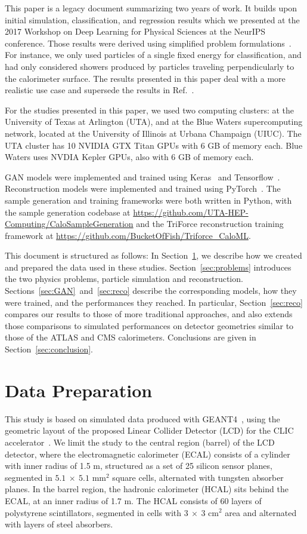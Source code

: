 This paper is a legacy document summarizing two years of work. It builds upon initial simulation, classification, and regression results which we presented at the 2017 Workshop on Deep Learning for Physical Sciences at the NeurIPS conference. Those results were derived using simplified problem formulations~\cite{Mau2017}.  For instance, we only used particles of a single fixed energy for classification, and had only considered showers produced by particles traveling perpendicularly to the calorimeter surface. The results presented in this paper deal with a more realistic use case and supersede the results in Ref.~\cite{Mau2017}. 

For the studies presented in this paper, we used two computing clusters: at the University of Texas at Arlington (UTA), and at the Blue Waters supercomputing network, located at the University of Illinois at Urbana Champaign (UIUC). The UTA cluster has 10 NVIDIA GTX Titan GPUs with 6 GB of memory each. Blue Waters uses NVDIA Kepler GPUs, also with 6 GB of memory each. 

GAN models were implemented and trained using Keras~\cite{keras} and  Tensorflow~\cite{tensorflow2015-whitepaper}. Reconstruction models were implemented and trained using PyTorch~\cite{PyTorch}. The sample generation and training frameworks were both written in Python, with the sample generation codebase at \url{https://github.com/UTA-HEP-Computing/CaloSampleGeneration} and the TriForce reconstruction training framework at \url{https://github.com/BucketOfFish/Triforce_CaloML}.

This document is structured as follows: In Section~\ref{sec:data}, we describe how we created and prepared the data used in these studies. Section~\ref{sec:problems} introduces the two physics problems, particle simulation and reconstruction. Sections~\ref{sec:GAN}~and~\ref{sec:reco} describe the corresponding models, how they were trained, and the performances they reached. In particular, Section~\ref{sec:reco} compares our results to those of more traditional approaches, and also extends those comparisons to simulated performances on detector geometries similar to those of the ATLAS and CMS calorimeters. Conclusions are given in Section~\ref{sec:conclusion}.

\chapter{Data Preparation}\label{sec:data}

This study is based on simulated data produced with GEANT4~\cite{GEANT4}, using the geometric layout of the proposed Linear Collider Detector (LCD) for the CLIC accelerator~\cite{Lebrun:2012hj}. We limit the study to the central region (barrel) of the LCD detector, where the electromagnetic calorimeter (ECAL) consists of a cylinder with inner radius of 1.5 m, structured as a set of 25 silicon sensor planes, segmented in $5.1~\times~5.1$ mm$^2$ square cells, alternated with tungsten absorber planes. In the barrel region, the hadronic calorimeter (HCAL) sits behind the ECAL, at an inner radius of 1.7 m. The HCAL 
consists of 60 layers of polystyrene scintillators, segmented in cells with  $3~\times~3$ cm$^2$ area and alternated with layers of steel absorbers. 


